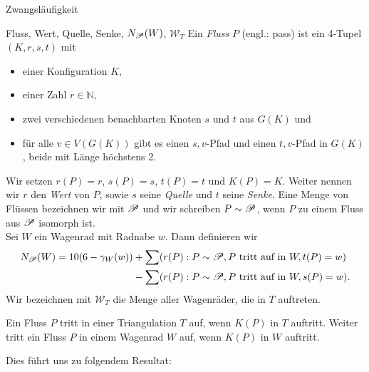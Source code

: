\begin{section}{Zwangsläufigkeit}
 \begin{definition}{Fluss, Wert, Quelle, Senke, $N_{\mathscr{P}}(W)$, $\mathscr{W}_T$}
  Ein \textit{Fluss} $P$ (engl.: pass) ist ein 4-Tupel $(K,r,s,t)$ mit
  \begin{itemize}
   \item einer Konfiguration $K$,
   \item einer Zahl $r \in \mathbb{N}$,
   \item zwei verschiedenen benachbarten Knoten $s$ und $t$ aus $G(K)$ und
   \item für alle $v \in V(G(K))$ gibt es einen $s,v$-Pfad und einen $t,v$-Pfad in $G(K)$, beide mit Länge höchstens 2.
  \end{itemize}
  Wir setzen $r(P) = r$, $s(P) = s$, $t(P) = t$ und $K(P) = K$. Weiter nennen wir $r$ den \textit{Wert} von $P$, sowie $s$ seine \textit{Quelle} und $t$ seine \textit{Senke}. Eine Menge von Flüssen bezeichnen wir mit $\mathscr{P}$ und wir schreiben $P \sim \mathscr{P}$, wenn $P$ zu einem Fluss aus $\mathscr{P}$ isomorph ist. \\
  Sei $W$ ein Wagenrad mit Radnabe $w$. Dann definieren wir\\
  \begin{align*}
     N_{\mathscr{P}}(W) = 10(6-\gamma_W(w)) &+ \sum (r(P) : P \sim \mathscr{P}, P \text{ tritt auf in } W, t(P)=w)\\
				   &- \sum (r(P) : P \sim \mathscr{P}, P \text{ tritt auf in } W, s(P)=w)\text{.}
  \end{align*}
  Wir bezeichnen mit $\mathscr{W}_T$ die Menge aller Wagenräder, die in $T$ auftreten. 
 \end{definition}
  
 Ein Fluss $P$ tritt in einer Triangulation $T$ auf, wenn $K(P)$ in $T$ auftritt. Weiter tritt ein Fluss $P$ in einem Wagenrad $W$ auf, wenn $K(P)$ in $W$ auftritt.
 
 Dies führt uns zu folgendem Resultat:
 

\end{section}
